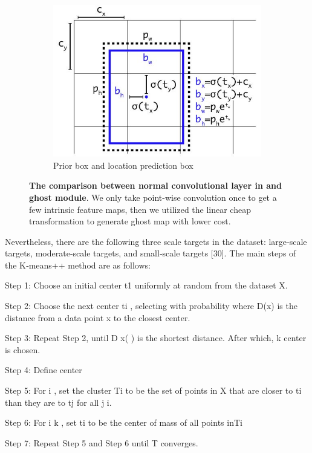 \begin{figure}[h]
\begin{center}
\begin{subfigure}[b]{0.49\textwidth}
			\includegraphics[width=\textwidth]{thesis-template-master/images/anchor.JPG}
			\caption{ Prior box and location prediction box}
			\label{fig:res18}
		\end{subfigure}
	\end{center}
	\caption{\textbf{The comparison between normal convolutional layer in \cite{b26}\cite{b27}\cite{b28} and ghost module}. We only take point-wise convolution once to get a few intrinsic feature maps, then we utilized the linear cheap transformation to generate ghost map with lower cost.}
\end{figure}

Nevertheless, there are the following three scale targets in the dataset: large‐scale targets, moderate‐scale targets, and small‐scale targets [30]. The main steps of the K‐means++ method are as follows:   

Step 1: Choose an initial center t1 uniformly at random from the dataset X.

Step 2: Choose the next center ti , selecting  with probability
where D(x) is the distance from a data point x to the closest center.

Step 3: Repeat Step 2, until D x( ) is the shortest distance. After which, k center is chosen.

Step 4: Define center 

Step 5: For i , set the cluster Ti to be the set of points in X that are closer to
ti than they are to tj for all j i.

Step 6: For i k , set ti to be the center of mass of all points inTi

Step 7: Repeat Step 5 and Step 6 until T converges.

